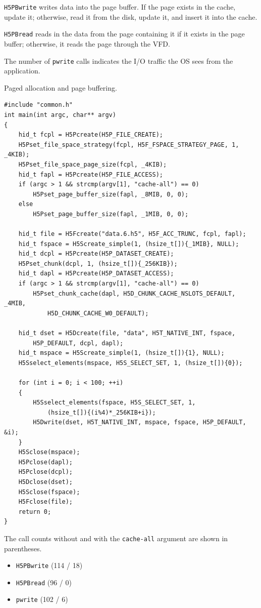 \texttt{H5PBwrite} writes data into the page buffer. If the page exists in the cache, update it; otherwise, read it from the disk, update it, and insert it into the cache.

\texttt{H5PBread} reads in the data from the page containing it if it exists in the page buffer; otherwise, it reads the page through the VFD.

The number of \texttt{pwrite} calls indicates the I/O traffic the OS sees from the application.

\begin{listing}
\centering
\caption{Paged allocation and page buffering.}
\label{lst:pages}
\begin{verbatim}
#include "common.h"
int main(int argc, char** argv)
{
    hid_t fcpl = H5Pcreate(H5P_FILE_CREATE);
    H5Pset_file_space_strategy(fcpl, H5F_FSPACE_STRATEGY_PAGE, 1, _4KIB);
    H5Pset_file_space_page_size(fcpl, _4KIB);
    hid_t fapl = H5Pcreate(H5P_FILE_ACCESS);
    if (argc > 1 && strcmp(argv[1], "cache-all") == 0)
        H5Pset_page_buffer_size(fapl, _8MIB, 0, 0);
    else
        H5Pset_page_buffer_size(fapl, _1MIB, 0, 0);

    hid_t file = H5Fcreate("data.6.h5", H5F_ACC_TRUNC, fcpl, fapl);
    hid_t fspace = H5Screate_simple(1, (hsize_t[]){_1MIB}, NULL);
    hid_t dcpl = H5Pcreate(H5P_DATASET_CREATE);
    H5Pset_chunk(dcpl, 1, (hsize_t[]){_256KIB});
    hid_t dapl = H5Pcreate(H5P_DATASET_ACCESS);
    if (argc > 1 && strcmp(argv[1], "cache-all") == 0)
        H5Pset_chunk_cache(dapl, H5D_CHUNK_CACHE_NSLOTS_DEFAULT, _4MIB,
            H5D_CHUNK_CACHE_W0_DEFAULT);

    hid_t dset = H5Dcreate(file, "data", H5T_NATIVE_INT, fspace,
        H5P_DEFAULT, dcpl, dapl);
    hid_t mspace = H5Screate_simple(1, (hsize_t[]){1}, NULL);
    H5Sselect_elements(mspace, H5S_SELECT_SET, 1, (hsize_t[]){0});
    
    for (int i = 0; i < 100; ++i)
    {
        H5Sselect_elements(fspace, H5S_SELECT_SET, 1,
            (hsize_t[]){(i%4)*_256KIB+i});
        H5Dwrite(dset, H5T_NATIVE_INT, mspace, fspace, H5P_DEFAULT, &i);
    }
    H5Sclose(mspace);
    H5Pclose(dapl);     
    H5Pclose(dcpl);  
    H5Dclose(dset);
    H5Sclose(fspace);
    H5Fclose(file);
    return 0;
}
\end{verbatim}
\end{listing}

The call counts without and with the \texttt{cache-all} argument are shown in parentheses.
\begin{itemize}
    \item \texttt{H5PBwrite} (114 / 18)
    \item \texttt{H5PBread} (96 / 0)
    \item \texttt{pwrite} (102 / 6)
\end{itemize}

